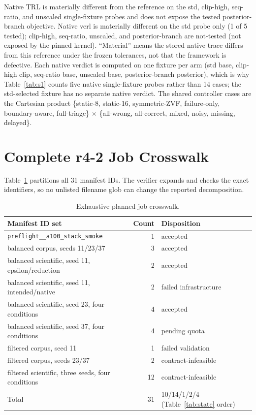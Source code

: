 \documentclass{article}
\begin{document}
Native TRL is materially different from the reference on the std,
clip-high, seq-ratio, and unscaled single-fixture probes and does not expose
the tested posterior-branch objective.  Native verl is materially different
on the std probe only (1 of 5 tested); clip-high, seq-ratio, unscaled, and
posterior-branch are not-tested (not exposed by the pinned kernel).  ``Material'' means the stored native trace differs from
this reference under the frozen tolerances, not that the framework is defective.
Each native verdict is computed on one fixture per arm (std base,
clip-high clip, seq-ratio base, unscaled base, posterior-branch posterior),
which is why Table~\ref{tab:s1} counts five native single-fixture probes
rather than 14 cases; the std-selected fixture has no separate native
verdict.
The shared controller cases are the Cartesian product
\{static-8, static-16, symmetric-ZVF, failure-only, boundary-aware,
full-triage\} $\times$ \{all-wrong, all-correct, mixed, noisy, missing,
delayed\}.

\section{Complete r4-2 Job Crosswalk}

Table~\ref{tab:crosswalk} partitions all 31 manifest IDs.  The verifier expands
and checks the exact identifiers, so no unlisted filename glob can change the
reported decomposition.

\begin{table}[h]
  \centering
  \caption{Exhaustive planned-job crosswalk.}
  \label{tab:crosswalk}
  \small
  \begin{tabularx}{\linewidth}{Xrl}
    \toprule
    Manifest ID set & Count & Disposition \\
    \midrule
    \texttt{preflight\_\_a100\_stack\_smoke} & 1 & accepted \\
    balanced corpus, seeds 11/23/37 & 3 & accepted \\
    balanced scientific, seed 11, epsilon/reduction & 2 & accepted \\
    balanced scientific, seed 11, intended/native & 2 & failed infrastructure \\
    balanced scientific, seed 23, four conditions & 4 & accepted \\
    balanced scientific, seed 37, four conditions & 4 & pending quota \\
    filtered corpus, seed 11 & 1 & failed validation \\
    filtered corpus, seeds 23/37 & 2 & contract-infeasible \\
    filtered scientific, three seeds, four conditions & 12 & contract-infeasible \\
    \midrule
    Total & 31 & 10/14/1/2/4 (Table~\ref{tab:state} order) \\
    \bottomrule
  \end{tabularx}
\end{table}
\end{document}
